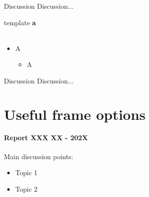 \documentclass{beamer}
\begin{document}
	
	\begin{frame}{Discussion}
		Discussion...
	\end{frame}
	

	\begin{frame}{template}
		\textbf{a}\\~\\
		\begin{itemize}
			\item A
			\begin{itemize}
				\item A
			\end{itemize}
		\end{itemize}
	\end{frame}
	\begin{frame}{}
		
	\end{frame}
		\begin{frame}{Discussion}
		Discussion...
	\end{frame}
	

	\section*{Useful frame options}
	\label{}
	\justifying
	\begin{frame}
		\textbf{Report XXX XX - 202X}\\~\\
		Main discussion points:
		\begin{itemize}
			\item Topic 1
			\item Topic 2
		\end{itemize}
	\end{frame}
\end{document}
